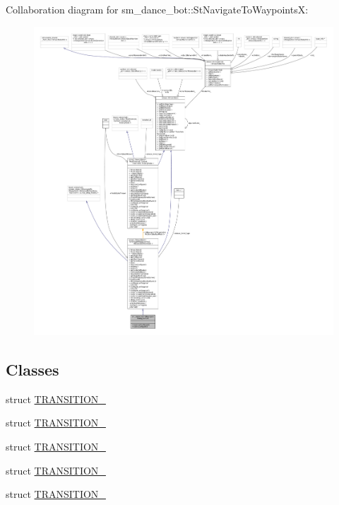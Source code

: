 Collaboration diagram for sm\+\_\+dance\+\_\+bot\+:\+:St\+Navigate\+To\+WaypointsX\+:
\nopagebreak
\begin{figure}[H]
\begin{center}
\leavevmode
\includegraphics[width=350pt]{structsm__dance__bot_1_1StNavigateToWaypointsX__coll__graph}
\end{center}
\end{figure}
\subsection*{Classes}
\begin{DoxyCompactItemize}
\item 
struct \hyperlink{structsm__dance__bot_1_1StNavigateToWaypointsX_1_1TRANSITION__1}{T\+R\+A\+N\+S\+I\+T\+I\+O\+N\+\_}
\item 
struct \hyperlink{structsm__dance__bot_1_1StNavigateToWaypointsX_1_1TRANSITION__2}{T\+R\+A\+N\+S\+I\+T\+I\+O\+N\+\_}
\item 
struct \hyperlink{structsm__dance__bot_1_1StNavigateToWaypointsX_1_1TRANSITION__3}{T\+R\+A\+N\+S\+I\+T\+I\+O\+N\+\_}
\item 
struct \hyperlink{structsm__dance__bot_1_1StNavigateToWaypointsX_1_1TRANSITION__4}{T\+R\+A\+N\+S\+I\+T\+I\+O\+N\+\_}
\item 
struct \hyperlink{structsm__dance__bot_1_1StNavigateToWaypointsX_1_1TRANSITION__5}{T\+R\+A\+N\+S\+I\+T\+I\+O\+N\+\_}
\end{DoxyCompactItemize}
